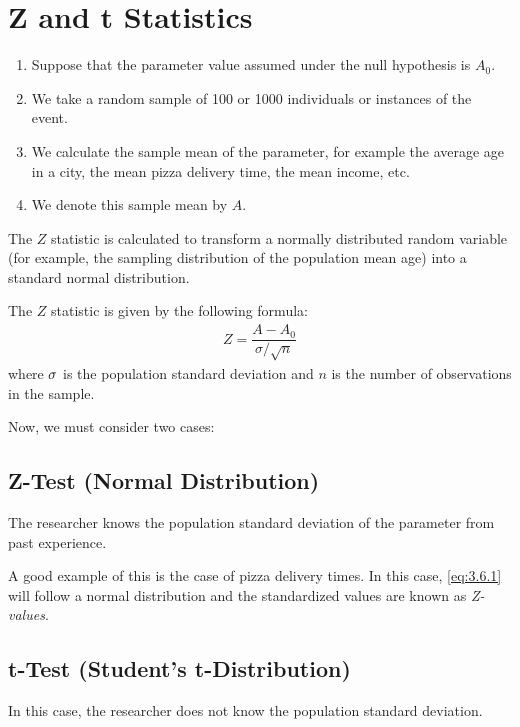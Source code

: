 \section*{Z and t Statistics}

\begin{enumerate}
	\item Suppose that the parameter value assumed under the null hypothesis is $A_0$. 
	\item We take a random sample of 100 or 1000 individuals or instances of the event. 
	\item We calculate the sample mean of the parameter, for example the average age in a city, the mean pizza delivery time, the mean income, etc. 
	\item We denote this sample mean by $A$.
\end{enumerate}




The $Z$ statistic is calculated to transform a normally distributed random variable (for example, the sampling distribution of the population mean age) into a standard normal distribution.


The $Z$ statistic is given by the following formula:
\begin{align}
	\label{eq:3.6.1}
	Z=\dfrac{A-A_{0}}{{\sigma}/{\sqrt{n}}}
\end{align}
where $\sigma$ is the population standard deviation and $n$ is the number of observations in the sample.


Now, we must consider two cases:

\subsection*{Z-Test (Normal Distribution)}
The researcher knows the population standard deviation of the parameter from past experience.



A good example of this is the case of pizza delivery times. In this case, \eqref{eq:3.6.1} will follow a normal distribution and the standardized values are known as \emph{Z-values}.

\subsection*{t-Test (Student's t-Distribution)}
In this case, the researcher does not know the population standard deviation.




